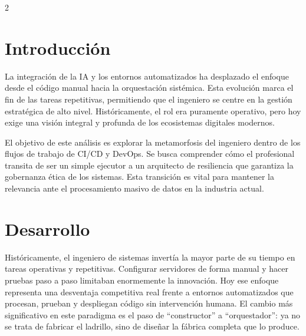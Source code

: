 \documentclass[10pt,spanish,Letterpaper,openany]{book}
\begin{document}
\begin {multicols}{2}

\section{Introducción}\label{introducciuxf3n-6}

La integración de la IA y los entornos automatizados ha desplazado el enfoque desde el código manual hacia la orquestación sistémica. Esta evolución marca el fin de las tareas repetitivas, permitiendo que el ingeniero se centre en la gestión estratégica de alto nivel. Históricamente, el rol era puramente operativo, pero hoy exige una visión integral y profunda de los ecosistemas digitales modernos.

El objetivo de este análisis es explorar la metamorfosis del ingeniero dentro de los flujos de trabajo de CI/CD y DevOps. Se busca comprender cómo el profesional transita de ser un simple ejecutor a un arquitecto de resiliencia que garantiza la gobernanza ética de los sistemas. Esta transición es vital para mantener la relevancia ante el procesamiento masivo de datos en la industria actual.

\section{Desarrollo}\label{desarrollo-2}

Históricamente, el ingeniero de sistemas invertía la mayor parte de su tiempo en tareas operativas y repetitivas. Configurar servidores de forma manual y hacer pruebas paso a paso limitaban enormemente la innovación. Hoy ese enfoque representa una desventaja competitiva real frente a entornos automatizados que procesan, prueban y despliegan código sin intervención humana. El cambio más significativo en este paradigma es el paso de ``constructor'' a ``orquestador'': ya no se trata de fabricar el ladrillo, sino de diseñar la fábrica completa que lo produce.

\end {multicols}
\end{document}
